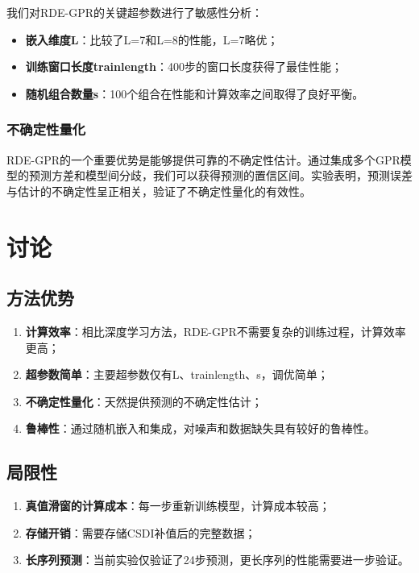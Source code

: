 \documentclass[12pt,a4paper]{article}
\begin{document}
我们对RDE-GPR的关键超参数进行了敏感性分析：
\begin{itemize}
    \item \textbf{嵌入维度L}：比较了L=7和L=8的性能，L=7略优；
    \item \textbf{训练窗口长度trainlength}：400步的窗口长度获得了最佳性能；
    \item \textbf{随机组合数量s}：100个组合在性能和计算效率之间取得了良好平衡。
\end{itemize}

\subsubsection{不确定性量化}

RDE-GPR的一个重要优势是能够提供可靠的不确定性估计。通过集成多个GPR模型的预测方差和模型间分歧，我们可以获得预测的置信区间。实验表明，预测误差与估计的不确定性呈正相关，验证了不确定性量化的有效性。

\section{讨论}

\subsection{方法优势}

\begin{enumerate}
    \item \textbf{计算效率}：相比深度学习方法，RDE-GPR不需要复杂的训练过程，计算效率更高；
    \item \textbf{超参数简单}：主要超参数仅有L、trainlength、s，调优简单；
    \item \textbf{不确定性量化}：天然提供预测的不确定性估计；
    \item \textbf{鲁棒性}：通过随机嵌入和集成，对噪声和数据缺失具有较好的鲁棒性。
\end{enumerate}

\subsection{局限性}

\begin{enumerate}
    \item \textbf{真值滑窗的计算成本}：每一步重新训练模型，计算成本较高；
    \item \textbf{存储开销}：需要存储CSDI补值后的完整数据；
    \item \textbf{长序列预测}：当前实验仅验证了24步预测，更长序列的性能需要进一步验证。
\end{enumerate}
\end{document}
